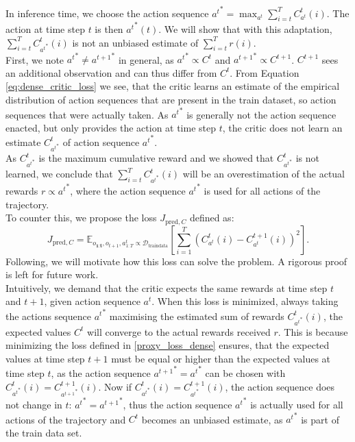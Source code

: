 In inference time, we choose the action sequence 
${a^t}^* = \max_{a^t} \sum_{i=t}^T C_{a^t}^t(i)$. The action at time step $t$ is then ${a^t}^*(t)$. We will show that with this adaptation, $\sum_{i=t}^T C_{{a^t}^*}^t(i)$ is not an unbiased estimate of 
$\sum_{i=t}^T r(i)$.\\

First, we note ${a^t}^* \neq {a^{t+1}}^*$ in general, as ${a^t}^* \propto C^t$ and ${a^{t+1}}^* \propto C^{t+1}$. $C^{t+1}$ sees an additional observation and can thus differ from $C^{t}$. 
From Equation \ref{eq:dense_critic_loss} we see, that the critic learns an estimate of the empirical distribution of action sequences that are present in the train dataset, so action sequences that 
were actually taken. As ${a^t}^*$ is generally not the action sequence enacted, but only provides the action at time step $t$, the critic does not learn an estimate $C_{{a^t}^*}^t$ of action sequence 
${a^t}^*$. \\

As $C_{{a^t}^*}^t$ is the maximum cumulative reward and we showed that $C_{{a^t}^*}^t$ is not learned, we conclude that $\sum_{i=t}^T C_{{a^t}^*}^t(i)$ 
will be an overestimation of the actual rewards $r \propto {a^t}^*$, where the action sequence ${a^t}^*$ is used for all actions of the trajectory. \\

To counter this, we propose the loss $J_{\mathrm{pred}, C}$ defined as:
\begin{equation}
    \label{proxy_loss_dense}
    J_{\mathrm{pred}, C} = \mathbb{E}_{o_{\textbf{1:t}} , o_{t+1}, a^t_{1:T} \propto \mathcal{D}_{\mathrm{train data}}}\left[ \sum_{i=1}^T(C_{{a^t}}^t(i) - C_{{a^t}}^{t+1}(i))^2 \right].
\end{equation}
Following, we will motivate how this loss can solve the problem. A rigorous proof 
is left for future work.\\

Intuitively, we demand that the critic expects the same rewards at time step $t$ and $t+1$, given action sequence $a^t$. When this loss is minimized, always taking the actions sequence ${a^t}^*$ maximising the estimated sum of 
rewards $C_{{a^t}^*}^t(i)$, 
the expected values $C^t$ will converge to the actual rewards received $r$. This is because minimizing the loss defined in \ref{proxy_loss_dense} ensures, that the expected 
values at time step $t+1$ must be equal or higher than the expected values at time step $t$, as the action sequence ${a^{t+1}}^* = {a^t}^*$ can be chosen with 
$C_{{{a^t}^*}}^t(i) = C_{{a^{t+1}}^*}^{t+1}(i)$. Now if $C_{{a^t}^*}^t(i) = C_{{a^t}^*}^{t+1}(i)$, the action sequence does not change in $t$: ${a^t}^* = {a^{t+1}}^*$, thus the action 
sequence ${a^t}^*$ is actually used for all actions of the trajectory and $C^t$ becomes an unbiased estimate, as ${a^t}^*$ is part of the train data set. \\

